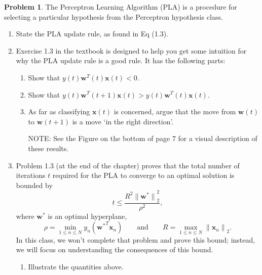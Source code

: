 \documentclass[10pt]{article}
\theoremstyle{definition}
\newtheorem{problem}{Problem}
\newcommand{\trans}[1]{{#1}^{T}}
\newcommand{\w}{\mathbf w}
\newcommand{\wstar}{{\w}^{*}}
\newcommand{\x}{\mathbf x}
\newcommand{\ltwo}[1]{{\lVert {#1} \rVert}_2}
\begin{document}
\newpage
\begin{problem}
    The Perceptron Learning Algorithm (PLA) is a procedure for selecting a particular hypothesis from the Perceptron hypothesis class.
    \begin{enumerate}
        \item State the PLA update rule, as found in Eq (1.3).
            \vspace{4in}
        \item Exercise 1.3 in the textbook is designed to help you get some intuition for why the PLA update rule is a good rule.
            It has the following parts:
            \begin{enumerate}
                \item Show that $y(t)\trans\w(t)\x(t) < 0$.
                    \vspace{4in}
                \item Show that $y(t)\trans\w(t+1)\x(t) > y(t)\trans\w(t)\x(t)$.
                    \vspace{4in}
                \item As far as classifying $\x(t)$ is concerned, argue that the move from $\w(t)$ to $\w(t+1)$ is a move `in the right direction'.

                    NOTE: See the Figure on the bottom of page 7 for a visual description of these results.
                    \vspace{4in}
            \end{enumerate}
            \newpage
        \item 
            Problem 1.3 (at the end of the chapter) proves that the total number of iterations $t$ required for the PLA to converge to an optimal solution is bounded by
            \begin{equation}
                t \le \frac{R^2 \ltwo{\wstar}^2}{\rho^2},
            \end{equation}
            where $\wstar$ is an optimal hyperplane,
    \begin{equation}
        \rho = \min_{1\le n\le N} y_n(\trans\wstar\x_n)
            \qquad\text{and}\qquad
        R = \max_{1\le n\le N} \ltwo{\x_n}.
    \end{equation}
            In this class, we won't complete that problem and prove this bound;
            instead, we will focus on understanding the consequences of this bound.
            \begin{enumerate}
                \item
                    Illustrate the quantities above.


\end{enumerate}
\end{enumerate}
\end{problem}
\end{document}
